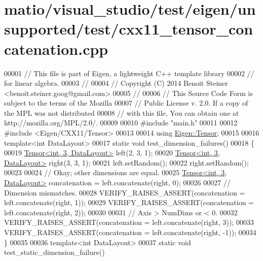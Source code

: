\hypertarget{matio_2visual__studio_2test_2eigen_2unsupported_2test_2cxx11__tensor__concatenation_8cpp_source}{}\section{matio/visual\+\_\+studio/test/eigen/unsupported/test/cxx11\+\_\+tensor\+\_\+concatenation.cpp}
\label{matio_2visual__studio_2test_2eigen_2unsupported_2test_2cxx11__tensor__concatenation_8cpp_source}

\begin{DoxyCode}
00001 \textcolor{comment}{// This file is part of Eigen, a lightweight C++ template library}
00002 \textcolor{comment}{// for linear algebra.}
00003 \textcolor{comment}{//}
00004 \textcolor{comment}{// Copyright (C) 2014 Benoit Steiner <benoit.steiner.goog@gmail.com>}
00005 \textcolor{comment}{//}
00006 \textcolor{comment}{// This Source Code Form is subject to the terms of the Mozilla}
00007 \textcolor{comment}{// Public License v. 2.0. If a copy of the MPL was not distributed}
00008 \textcolor{comment}{// with this file, You can obtain one at http://mozilla.org/MPL/2.0/.}
00009 
00010 \textcolor{preprocessor}{#include "main.h"}
00011 
00012 \textcolor{preprocessor}{#include <Eigen/CXX11/Tensor>}
00013 
00014 \textcolor{keyword}{using} \hyperlink{class_eigen_1_1_tensor}{Eigen::Tensor};
00015 
00016 \textcolor{keyword}{template}<\textcolor{keywordtype}{int} DataLayout>
00017 \textcolor{keyword}{static} \textcolor{keywordtype}{void} test\_dimension\_failures()
00018 \{
00019   \hyperlink{class_eigen_1_1_tensor}{Tensor<int, 3, DataLayout>} left(2, 3, 1);
00020   \hyperlink{class_eigen_1_1_tensor}{Tensor<int, 3, DataLayout>} right(3, 3, 1);
00021   left.setRandom();
00022   right.setRandom();
00023 
00024   \textcolor{comment}{// Okay; other dimensions are equal.}
00025   \hyperlink{class_eigen_1_1_tensor}{Tensor<int, 3, DataLayout>} concatenation = left.concatenate(right, 0);
00026 
00027   \textcolor{comment}{// Dimension mismatches.}
00028   VERIFY\_RAISES\_ASSERT(concatenation = left.concatenate(right, 1));
00029   VERIFY\_RAISES\_ASSERT(concatenation = left.concatenate(right, 2));
00030 
00031   \textcolor{comment}{// Axis > NumDims or < 0.}
00032   VERIFY\_RAISES\_ASSERT(concatenation = left.concatenate(right, 3));
00033   VERIFY\_RAISES\_ASSERT(concatenation = left.concatenate(right, -1));
00034 \}
00035 
00036 \textcolor{keyword}{template}<\textcolor{keywordtype}{int} DataLayout>
00037 \textcolor{keyword}{static} \textcolor{keywordtype}{void} test\_static\_dimension\_failure()

\end{DoxyCode}

